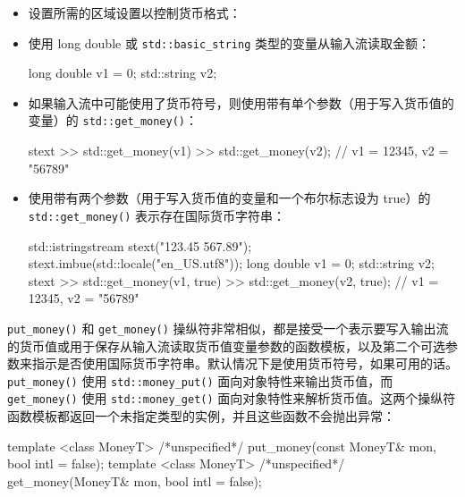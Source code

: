 \begin{itemize}
\item
设置所需的区域设置以控制货币格式：


\item
使用 long double 或 \verb|std::basic_string| 类型的变量从输入流读取金额：

\begin{cpp}
long double v1 = 0;
std::string v2;
\end{cpp}

\item
如果输入流中可能使用了货币符号，则使用带有单个参数（用于写入货币值的变量）的 \verb|std::get_money()|：

\begin{cpp}
stext >> std::get_money(v1) >> std::get_money(v2);
// v1 = 12345, v2 = "56789"
\end{cpp}

\item
使用带有两个参数（用于写入货币值的变量和一个布尔标志设为 true）的 \verb|std::get_money()| 表示存在国际货币字符串：

\begin{cpp}
std::istringstream stext("123.45 567.89");
stext.imbue(std::locale("en_US.utf8"));
long double v1 = 0;
std::string v2;
stext >> std::get_money(v1, true) >> std::get_money(v2, true);
// v1 = 12345, v2 = "56789"
\end{cpp}
\end{itemize}


\verb|put_money()| 和 \verb|get_money()| 操纵符非常相似，都是接受一个表示要写入输出流的货币值或用于保存从输入流读取货币值变量参数的函数模板，以及第二个可选参数来指示是否使用国际货币字符串。默认情况下是使用货币符号，如果可用的话。\verb|put_money()| 使用 \verb|std::money_put()| 面向对象特性来输出货币值，而 \verb|get_money()| 使用 \verb|std::money_get()| 面向对象特性来解析货币值。这两个操纵符函数模板都返回一个未指定类型的实例，并且这些函数不会抛出异常：

\begin{cpp}
template <class MoneyT>
/*unspecified*/ put_money(const MoneyT& mon, bool intl = false);
template <class MoneyT>
/*unspecified*/ get_money(MoneyT& mon, bool intl = false);
\end{cpp}

